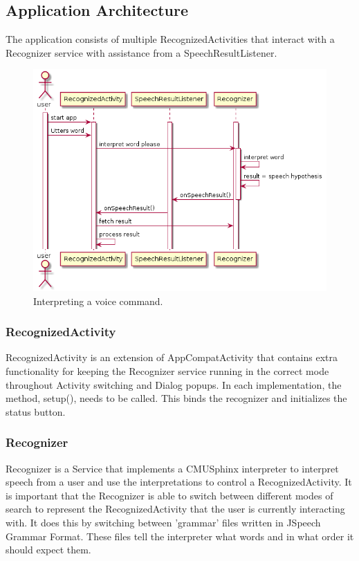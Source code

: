 \documentclass[11pt, oneside]{article}
\begin{document}
\subsection{Application Architecture}
The application consists of multiple RecognizedActivities that
interact with a Recognizer service with assistance from a
SpeechResultListener.

\begin{figure}[!h]
	\includegraphics[width=0.7\columnwidth]{speechsequence}
	\caption{Interpreting a voice command.}
\end{figure}

\subsubsection{RecognizedActivity}
RecognizedActivity is an extension of AppCompatActivity that contains
extra functionality for keeping the Recognizer service running in the
correct mode throughout Activity switching and Dialog popups. In each
implementation, the method, setup(), needs to be called. This binds
the recognizer and initializes the status button.

\subsubsection{Recognizer}
Recognizer is a Service that implements a CMUSphinx interpreter to
interpret speech from a user and use the interpretations to control a
RecognizedActivity. It is important that the Recognizer is able to
switch between different modes of search to represent the
RecognizedActivity that the user is currently interacting with. It
does this by switching between 'grammar' files written in JSpeech
Grammar Format. These files tell the interpreter what words and in
what order it should expect them.
\end{document}
